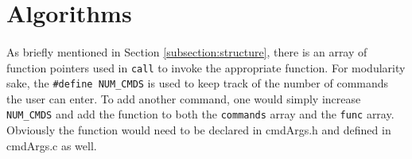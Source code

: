 \documentclass[10pt]{article}
\begin{document}
	\hspace{5mm}
	\hspace{5mm}

\section{Algorithms}
\label{section:algorithms}
\paragraph{}
As briefly mentioned in Section \ref{subsection:structure}, there is an array of function pointers used in \texttt{call} to invoke the appropriate function. For modularity sake, the \texttt{\#define NUM\_CMDS} is used to keep track of the number of commands the user can enter. To add another command, one would simply increase \texttt{NUM\_CMDS} and add the function to both the \texttt{commands} array and the \texttt{func} array. Obviously the function would need to be declared in cmdArgs.h and defined in cmdArgs.c as well.
\end{document}
